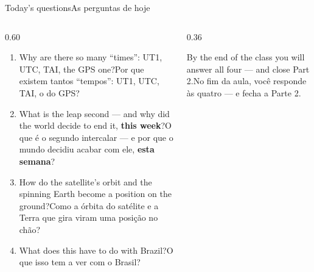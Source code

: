 \documentclass[aspectratio=169,11pt]{beamer}
\newcommand{\tr}[2]{\ifEN#2\else#1\fi}
\newcommand{\bnum}[1]{\textbf{\textcolor{mTeal}{#1}}}
\begin{document}
\begin{frame}{\tr{As perguntas de hoje}{Today's questions}}
  \begin{columns}[T]
    \begin{column}{0.60\textwidth}
      \begin{enumerate}
        \setlength{\itemsep}{7pt}
        \item \tr{Por que existem tantos ``tempos'': UT1, UTC, TAI, o do GPS?}{Why are there so many ``times'': UT1, UTC, TAI, the GPS one?}
        \item \tr{O que é o segundo intercalar --- e por que o mundo decidiu acabar com ele, \bnum{esta semana}?}{What is the leap second --- and why did the world decide to end it, \bnum{this week}?}
        \item \tr{Como a órbita do satélite e a Terra que gira viram uma posição no chão?}{How do the satellite's orbit and the spinning Earth become a position on the ground?}
        \item \tr{O que isso tem a ver com o Brasil?}{What does this have to do with Brazil?}
      \end{enumerate}
    \end{column}
    \begin{column}{0.36\textwidth}
      \begin{ideia}[title={\tr{Combinado}{Deal}}]
        \tr{No fim da aula, você responde às quatro --- e fecha a Parte 2.}{By the end of the class you will answer all four --- and close Part 2.}
      \end{ideia}
    \end{column}
  \end{columns}
\end{frame}
\end{document}
